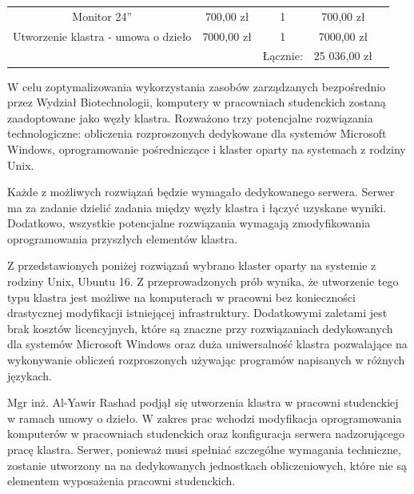 \documentclass{article}
\begin{document}
\begin{table}[]
\begin{tabular}{ccccl}
      \\ \cline{1-4}
\multicolumn{1}{|c|}{Monitor 24''}                                               
                          & \multicolumn{1}{c|}{700,00 zł}   & 
\multicolumn{1}{c|}{1}      & \multicolumn{1}{c|}{700,00 zł}    &                
      \\ \cline{1-4}
\multicolumn{1}{|c|}{Utworzenie klastra - umowa o dzieło}                       
                        
                          & \multicolumn{1}{c|}{7000,00 zł}   & 
\multicolumn{1}{c|}{1}      & \multicolumn{1}{c|}{7000,00 zł}    &              
  
      \\ \cline{1-4}      
 
                          &                                  & Łącznie:          
          & 25 036,00 zł                       & \multicolumn{1}{c}{}
\end{tabular}
\end{table}

W celu zoptymalizowania wykorzystania zasobów zarządzanych bezpośrednio przez 
Wydział Biotechnologii, komputery w pracowniach studenckich zostaną 
zaadoptowane jako węzły klastra. Rozważono trzy potencjalne rozwiązania 
technologiczne: obliczenia rozproszonych dedykowane dla systemów 
Microsoft Windows, oprogramowanie pośredniczące i klaster oparty na 
systemach z rodziny Unix.

Każde z możliwych rozwiązań będzie wymagało dedykowanego serwera. Serwer ma za 
zadanie dzielić zadania między węzły klastra i łączyć uzyskane wyniki. 
Dodatkowo, wszystkie potencjalne rozwiązania wymagają zmodyfikowania 
oprogramowania przyszłych elementów klastra.

Z przedstawionych poniżej rozwiązań wybrano klaster oparty na systemie z rodziny 
Unix, Ubuntu 16. Z przeprowadzonych prób wynika, że utworzenie tego typu klastra 
jest możliwe na komputerach w pracowni bez konieczności drastycznej modyfikacji 
istniejącej infrastruktury. Dodatkowymi zaletami jest brak kosztów licencyjnych, 
które są znaczne przy rozwiązaniach dedykowanych dla systemów Microsoft Windows 
oraz duża uniwersalność klastra pozwalające na wykonywanie obliczeń 
rozproszonych używając programów napisanych w różnych językach.

Mgr inż. Al-Yawir Rashad podjął się utworzenia klastra w pracowni studenckiej w 
ramach umowy o dzieło. W zakres prac wchodzi modyfikacja oprogramowania 
komputerów w pracowniach studenckich oraz konfiguracja serwera nadzorującego 
pracę klastra. Serwer, ponieważ musi spełniać szczególne wymagania techniczne, 
zostanie utworzony na na dedykowanych jednostkach obliczeniowych, które nie są 
elementem wyposażenia pracowni studenckich.
\end{document}
